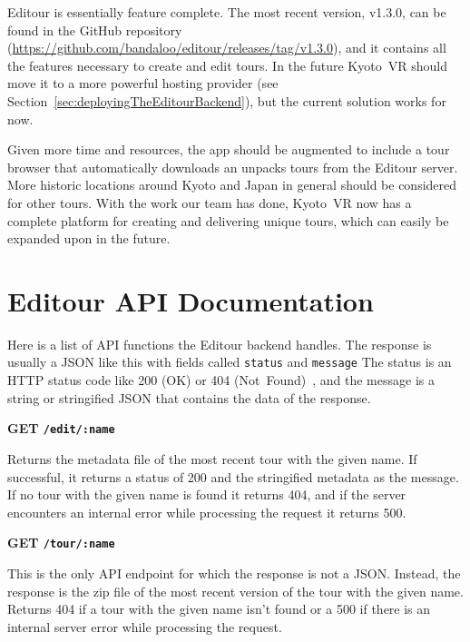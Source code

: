 \documentclass[a4paper, 10pt, american, titlepage]{article}
\newenvironment{indented}[1]%
{\begin{list}{}%
	{\setlength{\leftmargin}{#1}}%
	\item[]%
}
{\end{list}}
\begin{document}
Editour is essentially feature complete. The most recent version, v1.3.0, can be
found in the GitHub repository
(\url{https://github.com/bandaloo/editour/releases/tag/v1.3.0}), and it contains
all the features necessary to create and edit tours. In the future Kyoto~VR
should move it to a more powerful hosting provider (see
Section~\ref{sec:deployingTheEditourBackend}), but the current solution works
for now.

Given more time and resources, the app should be augmented to include a tour
browser that automatically downloads an unpacks tours from the Editour server.
More historic locations around Kyoto and Japan in general should be considered
for other tours. With the work our team has done, Kyoto~VR now has a complete
platform for creating and delivering unique tours, which can easily be expanded
upon in the future.

\clearpage

\begin{singlespace}
	\printbibliography
\end{singlespace}

\clearpage

\appendices
\section{Editour API Documentation}
\label{sec:editourAPIDocumentation}

Here is a list of API functions the Editour backend handles. The response is
usually a JSON like this with fields called \texttt{status} and \texttt{message}
The status is an HTTP status code like 200 (OK) or 404
(Not~Found)~\autocite{rfc7231}, and the message is a string or stringified JSON
that contains the data of the response.

\noindent\textbf{GET \texttt{/edit/:name}}

\begin{indented}{1cm}
	Returns the metadata file of the most recent tour with the given name. If
	successful, it returns a status of 200 and the stringified metadata as the
	message. If no tour with the given name is found it returns 404, and if the
	server encounters an internal error while processing the request it returns
	500.
\end{indented}

\noindent\textbf{GET \texttt{/tour/:name}}

\begin{indented}{1cm}
	This is the only API endpoint for which the response is not a JSON. Instead,
	the response is the zip file of the most recent version of the tour with the
	given name. Returns 404 if a tour with the given name isn't found or a 500
	if there is an internal server error while processing the request.
\end{indented}
\end{document}
